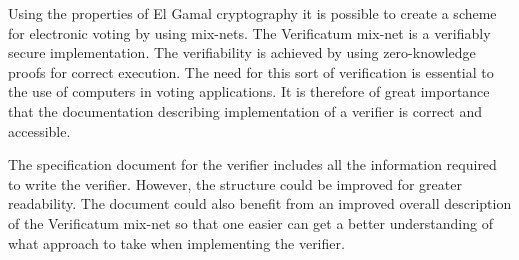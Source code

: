 Using the properties of El Gamal cryptography it is possible to create
a scheme for electronic voting by using mix-nets. The Verificatum
mix-net is a verifiably secure implementation. The verifiability is
achieved by using zero-knowledge proofs for correct execution. The
need for this sort of verification is essential to the use of
computers in voting applications. It is therefore of great importance
that the documentation describing implementation of a verifier is
correct and accessible.

The specification document for the verifier includes all the
information required to write the verifier. However, the structure
could be improved for greater readability. The document could also
benefit from an improved overall description of the Verificatum
mix-net so that one easier can get a better understanding of what
approach to take when implementing the verifier.

\vspace{22pt}
